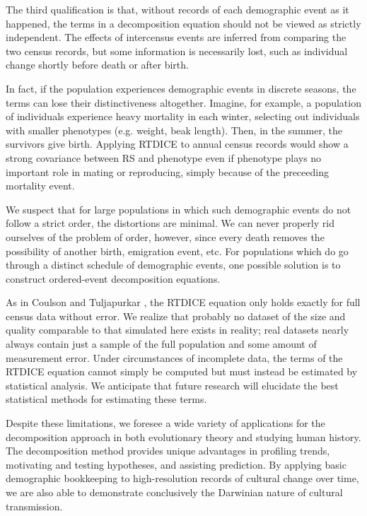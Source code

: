 \documentclass[11pt]{article}
\begin{document}
The third qualification is that, without records of each demographic event as it happened, the terms in a decomposition equation should not be viewed as strictly independent.  The effects of intercensus events are inferred from comparing the two census records, but some information is necessarily lost, such as individual change shortly before death or after birth. 

In fact, if the population experiences demographic events in discrete seasons, the terms can lose their distinctiveness altogether.  Imagine, for example, a population of individuals experience heavy mortality in each winter, selecting out individuals with smaller phenotypes (e.g. weight, beak length).  Then, in the summer, the survivors give birth.  Applying RTDICE to annual census records would show a strong covariance between RS and phenotype even if phenotype plays no important role in mating or reproducing, simply because of the preceeding mortality event.  

We suspect that for large populations in which such demographic events do not follow a strict order, the distortions are minimal.  We can never properly rid ourselves of the problem of order, however, since every death removes the possibility of another birth, emigration event, etc.  For populations which do go through a distinct schedule of demographic events, one possible solution is to construct ordered-event decomposition equations.  

As in Coulson and Tuljapurkar \citeyearpar{coulson2008dynamics}, the RTDICE equation only holds exactly for full census data without error. We realize that probably no dataset of the size and quality comparable to that simulated here exists in reality; real datasets nearly always contain just a sample of the full population and some amount of measurement error. Under circumstances of incomplete data, the terms of the RTDICE equation cannot simply be computed but must instead be estimated by statistical analysis. We anticipate that future research will elucidate the best statistical methods for estimating these terms.

Despite these limitations, we foresee a wide variety of applications for the decomposition approach in both evolutionary theory and studying human history.  The decomposition method provides unique advantages in profiling trends, motivating and testing hypotheses, and assisting prediction.  By applying basic demographic bookkeeping to high-resolution records of cultural change over time, we are also able to demonstrate conclusively the Darwinian nature of cultural transmission.    
\end{document}
